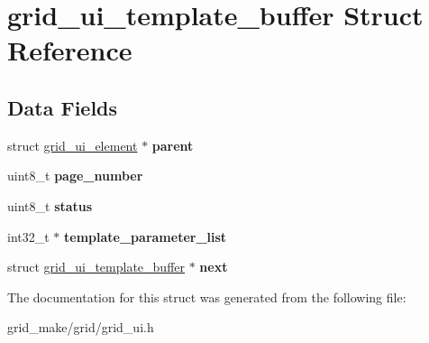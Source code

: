 \hypertarget{structgrid__ui__template__buffer}{\section{grid\-\_\-ui\-\_\-template\-\_\-buffer Struct Reference}
\label{structgrid__ui__template__buffer}
}
\subsection*{Data Fields}
\begin{DoxyCompactItemize}
\item 
\hypertarget{structgrid__ui__template__buffer_a49ceba60e66ffa6bbfa031f0f72060c4}{struct \hyperlink{structgrid__ui__element}{grid\-\_\-ui\-\_\-element} $\ast$ {\bfseries parent}}\label{structgrid__ui__template__buffer_a49ceba60e66ffa6bbfa031f0f72060c4}

\item 
\hypertarget{structgrid__ui__template__buffer_a89f6b2e0c62c7497579d2093049f20b8}{uint8\-\_\-t {\bfseries page\-\_\-number}}\label{structgrid__ui__template__buffer_a89f6b2e0c62c7497579d2093049f20b8}

\item 
\hypertarget{structgrid__ui__template__buffer_a6b19dafce9f0e61604d661f7d3941493}{uint8\-\_\-t {\bfseries status}}\label{structgrid__ui__template__buffer_a6b19dafce9f0e61604d661f7d3941493}

\item 
\hypertarget{structgrid__ui__template__buffer_ae83e579723d3f204b33ac84e9911a624}{int32\-\_\-t $\ast$ {\bfseries template\-\_\-parameter\-\_\-list}}\label{structgrid__ui__template__buffer_ae83e579723d3f204b33ac84e9911a624}

\item 
\hypertarget{structgrid__ui__template__buffer_a62c1ed084923359b023778d43320179f}{struct \hyperlink{structgrid__ui__template__buffer}{grid\-\_\-ui\-\_\-template\-\_\-buffer} $\ast$ {\bfseries next}}\label{structgrid__ui__template__buffer_a62c1ed084923359b023778d43320179f}

\end{DoxyCompactItemize}


The documentation for this struct was generated from the following file\-:\begin{DoxyCompactItemize}
\item 
grid\-\_\-make/grid/grid\-\_\-ui.\-h\end{DoxyCompactItemize}

